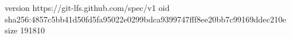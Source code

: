 version https://git-lfs.github.com/spec/v1
oid sha256:4857c5bb41d50fd5fa95022e0299bdca9399747fff8ee20bb7c99169ddec210e
size 191810
